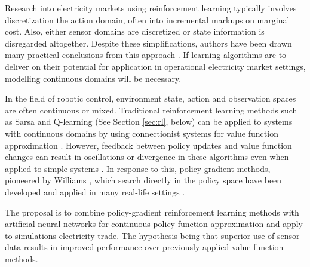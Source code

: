Research into electricity markets using reinforcement learning typically
involves discretization the action domain, often into incremental markups
on marginal cost.  Also, either sensor domains are discretized or state
information is disregarded altogether.  Despite these simplifications, authors
have been drawn many practical conclusions from this approach \cite{anke:2008}.
If learning algorithms are to deliver on their potential for application in
operational electricity market settings, modelling continuous domains will be
necessary.

In the field of robotic control, environment state, action and observation
spaces are often continuous or mixed.
Traditional reinforcement learning methods such as Sarsa and Q-learning (See
Section \ref{sec:rl}, below) can be applied to systems with continuous domains
by using connectionist systems for value function approximation
\cite{barto:neuron}. However, feedback between policy updates and value
function changes can result in oscillations or divergence in these algorithms
even when applied to simple systems \cite{peters:enac}.  In response to this,
policy-gradient methods, pioneered by Williams \cite{williams:reinforce}, which
search directly in the policy space have been developed and applied in many
real-life settings
\cite{barto:policy,shaal:robots,moody:direct,peshkin:routing}.

The proposal is to combine policy-gradient reinforcement learning methods with
artificial neural networks for continuous policy function approximation and
apply to simulations electricity trade.  The hypothesis being that superior use
of sensor data results in improved performance over previously applied
value-function methods.



